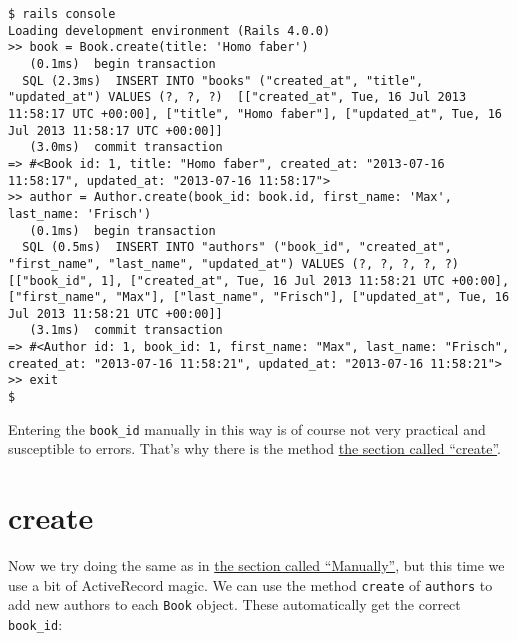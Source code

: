 \documentclass[a4paper]{book}
\newcommand{\chap}[1]{\newpage\thispagestyle{empty}\chapter{#1}\label{chap:\thechapter}}
\begin{document}
\begin{shaded}\begin{verbatim}
$ rails console
Loading development environment (Rails 4.0.0)
>> book = Book.create(title: 'Homo faber')
   (0.1ms)  begin transaction
  SQL (2.3ms)  INSERT INTO "books" ("created_at", "title", "updated_at") VALUES (?, ?, ?)  [["created_at", Tue, 16 Jul 2013 11:58:17 UTC +00:00], ["title", "Homo faber"], ["updated_at", Tue, 16 Jul 2013 11:58:17 UTC +00:00]]
   (3.0ms)  commit transaction
=> #<Book id: 1, title: "Homo faber", created_at: "2013-07-16 11:58:17", updated_at: "2013-07-16 11:58:17">
>> author = Author.create(book_id: book.id, first_name: 'Max', last_name: 'Frisch')
   (0.1ms)  begin transaction
  SQL (0.5ms)  INSERT INTO "authors" ("book_id", "created_at", "first_name", "last_name", "updated_at") VALUES (?, ?, ?, ?, ?)  [["book_id", 1], ["created_at", Tue, 16 Jul 2013 11:58:21 UTC +00:00], ["first_name", "Max"], ["last_name", "Frisch"], ["updated_at", Tue, 16 Jul 2013 11:58:21 UTC +00:00]]
   (3.1ms)  commit transaction
=> #<Author id: 1, book_id: 1, first_name: "Max", last_name: "Frisch", created_at: "2013-07-16 11:58:21", updated_at: "2013-07-16 11:58:21">
>> exit
$
\end{verbatim}\end{shaded}

Entering the \texttt{book\_id} manually in this way is of course not very practical and susceptible to errors. That's why there is the method \hyperref[activerecordux5fhasux5fmanyux5fcreate]{the section called “create”}.

\chap{create}\label{create-1}

Now we try doing the same as in \hyperref[activerecordux5fhinzufuegenux5fmanuell]{the section called “Manually”}, but this time we use a bit of ActiveRecord magic. We can use the method \texttt{create} of \texttt{authors} to add new authors to each \texttt{Book} object. These automatically get the correct \texttt{book\_id}:
\end{document}
